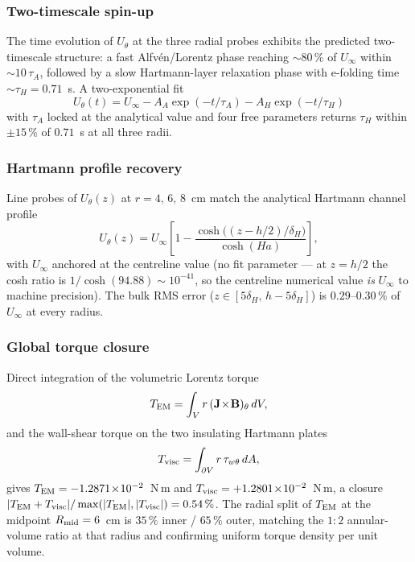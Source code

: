\documentclass[aps,prl,twocolumn,superscriptaddress]{revtex4-2}
\begin{document}
\subsubsection*{Two-timescale spin-up}
The time evolution of $U_\theta$ at the three radial probes exhibits
the predicted two-timescale structure: a fast Alfv\'en/Lorentz phase
reaching $\sim\!80\,\%$ of $U_\infty$ within $\sim\!10\,\tau_A$,
followed by a slow Hartmann-layer relaxation phase with
e-folding time $\sim\tau_H = 0.71$~s.  A two-exponential fit
\begin{equation}
U_\theta(t) = U_\infty - A_A\exp(-t/\tau_A) - A_H\exp(-t/\tau_H)
\label{eq:two_exp}
\end{equation}
with $\tau_A$ locked at the analytical value and four free parameters
returns $\tau_H$ within $\pm 15\,\%$ of $0.71$~s at all three radii.

\subsubsection*{Hartmann profile recovery}
Line probes of $U_\theta(z)$ at $r = 4,\,6,\,8$~cm match the
analytical Hartmann channel profile~\cite{1}
\begin{equation}
U_\theta(z) = U_\infty\!\left[1 - \frac{\cosh\!\bigl((z-h/2)/\delta_H\bigr)}
                                          {\cosh(Ha)}\right],
\label{eq:hartmann_profile}
\end{equation}
with $U_\infty$ anchored at the centreline value (no fit parameter
--- at $z = h/2$ the cosh ratio is $1/\cosh(94.88)\sim 10^{-41}$, so
the centreline numerical value \emph{is} $U_\infty$ to machine
precision).  The bulk RMS error
($z\in[5\delta_H,\,h-5\delta_H]$) is $0.29$--$0.30\,\%$ of $U_\infty$
at every radius.

\subsubsection*{Global torque closure}
Direct integration of the volumetric Lorentz torque
\begin{equation}
T_{\rm EM} = \int_V r\,(\mathbf{J}\!\times\!\mathbf{B})_\theta\,dV,
\label{eq:tem}
\end{equation}
and the wall-shear torque on the two insulating Hartmann plates
\begin{equation}
T_{\rm visc} = \int_{\partial V} r\,\tau_{w\theta}\,dA,
\label{eq:tvisc}
\end{equation}
gives $T_{\rm EM} = -1.2871\!\times\!10^{-2}$~N\,m and
$T_{\rm visc} = +1.2801\!\times\!10^{-2}$~N\,m, a closure
$|T_{\rm EM}+T_{\rm visc}|/\max(|T_{\rm EM}|,|T_{\rm visc}|) =
0.54\,\%$.  The radial split of $T_{\rm EM}$ at the midpoint
$R_{\rm mid} = 6$~cm is $35\,\%$ inner / $65\,\%$ outer, matching the
$1\!:\!2$ annular-volume ratio at that radius and confirming uniform
torque density per unit volume.
\end{document}
